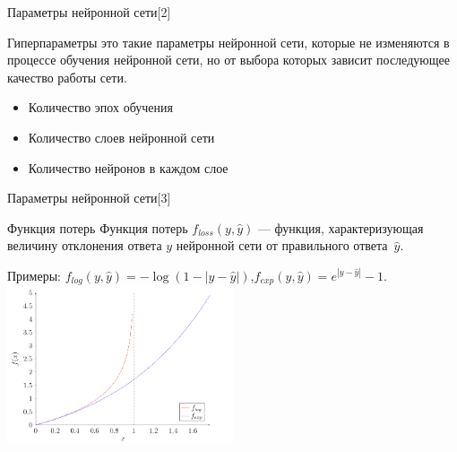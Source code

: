 \documentclass{beamer}
\begin{document}
\begin{frame}{Параметры нейронной сети[2]}
\begin{block}{Гиперпараметры}
это такие параметры нейронной сети, которые не изменяются в процессе обучения нейронной сети, но от выбора которых зависит последующее качество работы сети.
\end{block}

\pause
\begin{block}{}
 \begin{itemize}
  \item Количество эпох обучения
  \item Количество слоев нейронной сети
  \item Количество нейронов в каждом слое
  \end{itemize}
\end{block}


\end{frame}




\begin{frame}{Параметры нейронной сети[3]}
\begin{block}{Функция потерь}
Функция потерь $f_{loss}(y, \hat{y})$ --- функция, характеризующая величину отклонения ответа $y$ нейронной сети от правильного ответа~$\hat{y}$.
\end{block}
\pause

 \begin{center}
Примеры: \quad $f_{log}(y, \hat{y}) = -\log(1 - |y-\hat{y}|)$,\qquad $f_{exp}(y, \hat{y}) = e^{|y-\hat{y}|} - 1$.
  \includegraphics[width=0.5\textwidth]{losses_graphics.png}
 \end{center}

\end{frame}
\end{document}
